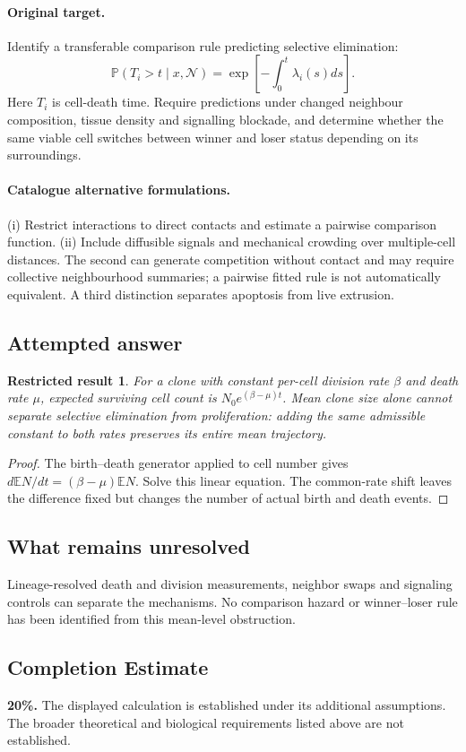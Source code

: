 \documentclass[11pt]{article}
\newcommand{\E}{\mathbb E}
\newcommand{\Prob}{\mathbb P}
\providecommand{\E}{\mathbb E}
\providecommand{\Prob}{\mathbb P}
\newtheorem{attemptresult}{Restricted result}[section]
\begin{document}
\paragraph{Original target.}
Identify a transferable comparison rule predicting selective elimination:
\[
\Prob(T_i>t\mid x,\mathcal N)=\exp\!\left[-\int_0^t\lambda_i(s)ds\right].
\]
Here $T_i$ is cell-death time. Require predictions under changed neighbour composition, tissue density and signalling blockade, and determine whether the same viable cell switches between winner and loser status depending on its surroundings.
\paragraph{Catalogue alternative formulations.}
(i) Restrict interactions to direct contacts and estimate a pairwise comparison function. (ii) Include diffusible signals and mechanical crowding over multiple-cell distances. The second can generate competition without contact and may require collective neighbourhood summaries; a pairwise fitted rule is not automatically equivalent. A third distinction separates apoptosis from live extrusion.
\subsection{Attempted answer}
\begin{attemptresult}
For a clone with constant per-cell division rate $\beta$ and death rate $\mu$, expected surviving cell count is $N_0e^{(\beta-\mu)t}$. Mean clone size alone cannot separate selective elimination from proliferation: adding the same admissible constant to both rates preserves its entire mean trajectory.
\end{attemptresult}
\begin{proof}
The birth--death generator applied to cell number gives $d\E N/dt=(\beta-\mu)\E N$. Solve this linear equation. The common-rate shift leaves the difference fixed but changes the number of actual birth and death events.
\end{proof}
\subsection{What remains unresolved}
Lineage-resolved death and division measurements, neighbor swaps and signaling controls can separate the mechanisms. No comparison hazard or winner--loser rule has been identified from this mean-level obstruction.
\subsection{Completion Estimate}
\textbf{20\%.} The displayed calculation is established under its additional assumptions. The broader theoretical and biological requirements listed above are not established.
\end{document}
